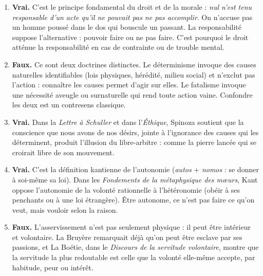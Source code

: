 \documentclass[11pt]{article}
\newcommand{\cle}[1]{{\popxbold\color{popdark}#1}}
\begin{document}
\begin{corrige}
\begin{enumerate}
\item \textbf{Vrai.} C'est le principe fondamental du droit et de la morale : \emph{nul n'est tenu responsable d'un acte qu'il ne pouvait pas ne pas accomplir}. On n'accuse pas un homme poussé dans le dos qui bouscule un passant. La responsabilité suppose l'alternative : pouvoir faire ou ne pas faire. C'est pourquoi le droit atténue la responsabilité en cas de contrainte ou de trouble mental.
\item \textbf{Faux.} Ce sont deux doctrines distinctes. Le déterminisme invoque des causes naturelles identifiables (lois physiques, hérédité, milieu social) et n'exclut pas l'action : connaître les causes permet d'agir sur elles. Le fatalisme invoque une nécessité aveugle ou surnaturelle qui rend toute action vaine. Confondre les deux est un contresens classique.
\item \textbf{Vrai.} Dans la \emph{Lettre à Schuller} et dans l'\emph{Éthique}, Spinoza soutient que la conscience que nous avons de nos désirs, jointe à l'ignorance des causes qui les déterminent, produit l'illusion du libre-arbitre : comme la pierre lancée qui se croirait libre de son mouvement.
\item \textbf{Vrai.} C'est la définition kantienne de l'\cle{autonomie} (\emph{autos} + \emph{nomos} : se donner à soi-même sa loi). Dans les \emph{Fondements de la métaphysique des mœurs}, Kant oppose l'autonomie de la volonté rationnelle à l'\cle{hétéronomie} (obéir à ses penchants ou à une loi étrangère). Être autonome, ce n'est pas faire ce qu'on veut, mais vouloir selon la raison.
\item \textbf{Faux.} L'\cle{asservissement} n'est pas seulement physique : il peut être intérieur et volontaire. La Bruyère remarquait déjà qu'on peut être esclave par ses passions, et La Boétie, dans le \emph{Discours de la servitude volontaire}, montre que la servitude la plus redoutable est celle que la volonté elle-même accepte, par habitude, peur ou intérêt.
\end{enumerate}
\end{corrige}
\end{document}
